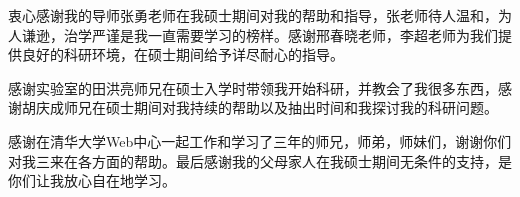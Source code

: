 
\begin{ack}

衷心感谢我的导师张勇老师在我硕士期间对我的帮助和指导，张老师待人温和，为人谦逊，治学严谨是我一直需要学习的榜样。感谢邢春晓老师，李超老师为我们提供良好的科研环境，在硕士期间给予详尽耐心的指导。

感谢实验室的田洪亮师兄在硕士入学时带领我开始科研，并教会了我很多东西，感谢胡庆成师兄在硕士期间对我持续的帮助以及抽出时间和我探讨我的科研问题。

感谢在清华大学Web中心一起工作和学习了三年的师兄，师弟，师妹们，谢谢你们对我三来在各方面的帮助。最后感谢我的父母家人在我硕士期间无条件的支持，是你们让我放心自在地学习。

\end{ack}
